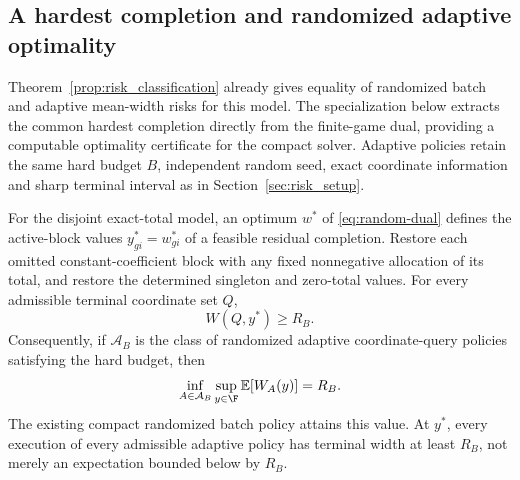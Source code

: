 \subsection{A hardest completion and randomized adaptive optimality}
\label{sec:adaptive-dual-completion}

Theorem~\ref{prop:risk_classification} already gives equality of randomized
batch and adaptive mean-width risks for this model. The specialization below
extracts the common hardest completion directly from the finite-game dual,
providing a computable optimality certificate for the compact solver.
Adaptive policies retain the same hard budget $B$, independent random seed,
exact coordinate information and sharp terminal interval as in
Section~\ref{sec:risk_setup}.

\begin{proposition}
\label{prop:adaptive-dual-completion}
For the disjoint exact-total model, an optimum $w^*$ of
\eqref{eq:random-dual} defines the active-block values
$y^*_{gi}=w^*_{gi}$ of a feasible residual completion. Restore each omitted
constant-coefficient block with any fixed nonnegative allocation of its
total, and restore the determined singleton and zero-total values.
For every admissible terminal coordinate set $Q$,
\begin{equation}
 W(Q,y^*)\geq R_B.
 \label{eq:common-hardest-width}
\end{equation}
Consequently, if $\mathcal A_B$ is the class of randomized adaptive
coordinate-query policies satisfying the hard budget, then
\begin{equation}
 \inf_{A\in\mathcal A_B}\sup_{y\in\F}
       \mathbb E[W_A(y)] = R_B.
 \label{eq:adaptive-random-equality}
\end{equation}
The existing compact randomized batch policy attains this value. At $y^*$,
every execution of every admissible adaptive policy has terminal width at
least $R_B$, not merely an expectation bounded below by $R_B$.
\end{proposition}

